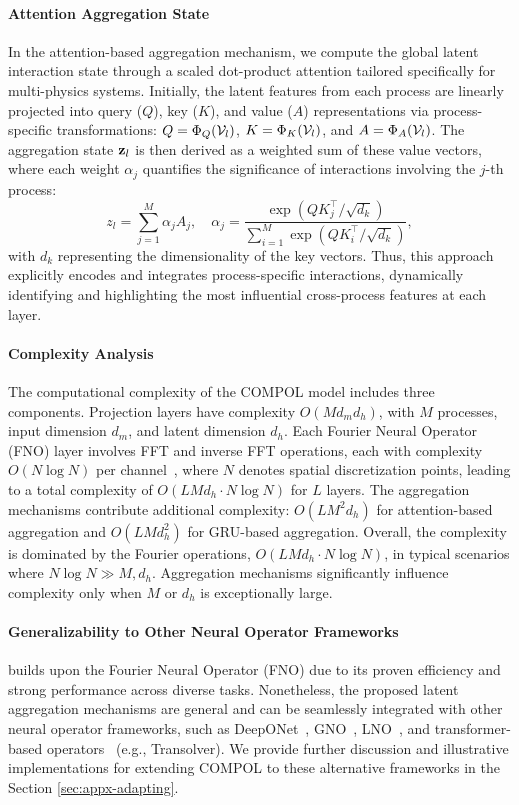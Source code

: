 \paragraph{Attention Aggregation State} In the attention-based aggregation mechanism, we compute the global latent interaction state through a scaled dot-product attention tailored specifically for multi-physics systems. Initially, the latent features from each process are linearly projected into query ($Q$), key ($K$), and value ($A$) representations via process-specific transformations: $Q=\Phi_Q(\mathcal{V}_l)$, $K=\Phi_K(\mathcal{V}_l)$, and $A=\Phi_A(\mathcal{V}_l)$. The aggregation state ${\bf z}_l$ is then derived as a weighted sum of these value vectors, where each weight $\alpha_j$ quantifies the significance of interactions involving the $j$-th process:
\[
z_l=\sum_{j=1}^M \alpha_j A_j, \quad \alpha_j=\frac{\exp \left(Q K_j^{\top} / \sqrt{d_k}\right)}{\sum_{i=1}^M \exp \left(Q K_i^{\top} / \sqrt{d_k}\right)},
\]
with $d_k$ representing the dimensionality of the key vectors. Thus, this approach explicitly encodes and integrates process-specific interactions, dynamically identifying and highlighting the most influential cross-process features at each layer.
\paragraph{Complexity Analysis} The computational complexity of the COMPOL model includes three components. Projection layers have complexity $O(M  d_m  d_h)$, with $M$ processes, input dimension $d_m$, and latent dimension $d_h$. Each Fourier Neural Operator (FNO) layer involves FFT and inverse FFT operations, each with complexity $O(N \log N)$ per channel~\citep{cooley1965algorithm}, where $N$ denotes spatial discretization points, leading to a total complexity of $O(L  M  d_h \cdot N \log N)$ for $L$ layers. The aggregation mechanisms contribute additional complexity: $O(L  M^2  d_h)$ for attention-based aggregation and $O(L  M  d_h^2)$ for GRU-based aggregation. Overall, the complexity is dominated by the Fourier operations, $O(L  M  d_h \cdot N \log N)$, in typical scenarios where $N \log N \gg M, d_h$. Aggregation mechanisms significantly influence complexity only when $M$ or $d_h$ is exceptionally large.
\paragraph{Generalizability to Other Neural Operator Frameworks} \ours builds upon the Fourier Neural Operator (FNO) due to its proven efficiency and strong performance across diverse tasks. Nonetheless, the proposed latent aggregation mechanisms are general and can be seamlessly integrated with other neural operator frameworks, such as DeepONet~\citep{lu2021learning}, GNO~\citep{li2020neural}, LNO~\citep{kovachki2023neural}, and transformer-based operators~\citep{wu2024transolver} (e.g., Transolver). We provide further discussion and illustrative implementations for extending COMPOL to these alternative frameworks in the Section \ref{sec:appx-adapting}.
